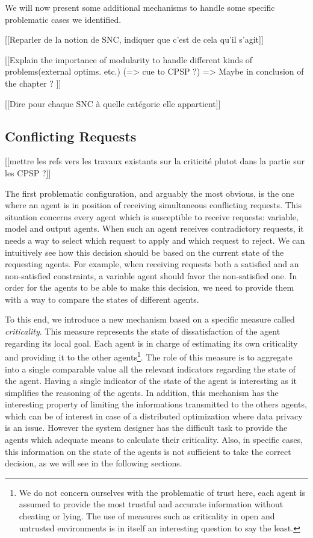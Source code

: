 We will now present some additional mechanisms to handle some specific problematic cases we identified.

[[Reparler de la notion de SNC, indiquer que c'est de cela qu'il s'agit]]

[[Explain the importance of modularity to handle different kinds of problems(external optims. etc.)
(=> cue to CPSP ?)
=> Maybe in conclusion of the chapter ?
]]

[[Dire pour chaque SNC à quelle catégorie elle appartient]]

\subsection{Conflicting Requests}

[[mettre les refs vers les travaux existants sur la criticité plutot dans la partie sur les CPSP ?]]

The first problematic configuration, and arguably the most obvious, is the one where an agent is in position of receiving simultaneous conflicting requests. This situation concerns every agent which is susceptible to receive requests: variable, model and output agents. When such an agent receives contradictory requests, it needs a way to select which request to apply and which request to reject. We can intuitively see how this decision should be based on the current state of the requesting agents. For example, when receiving requests both a satisfied and an non-satisfied constraints, a variable agent should favor the non-satisfied one. In order for the agents to be able to make this decision, we need to provide them with a way to compare the states of different agents.

To this end, we introduce a new mechanism based on a specific measure called \emph{criticality}. This measure represents the state of dissatisfaction of the agent regarding its local goal. Each agent is in charge of estimating its own criticality and providing it to the other agents\footnote{We do not concern ourselves with the problematic of trust here, each agent is assumed to provide the most trustful and accurate information without cheating or lying. The use of measures such as criticality in open and untrusted environments is in itself an interesting question to say the least.}. The role of this measure is to aggregate into a single comparable value all the relevant indicators regarding the state of the agent. Having a single indicator of the state of the agent is interesting as it simplifies the reasoning of the agents. In addition, this mechanism has the interesting property of limiting the informations transmitted to the others agents, which can be of interest in case of a distributed optimization where data privacy is an issue.
However the system designer has the difficult task to provide the agents which adequate means to calculate their criticality. Also, in specific cases, this information on the state of the agents is not sufficient to take the correct decision, as we will see in the following sections.


